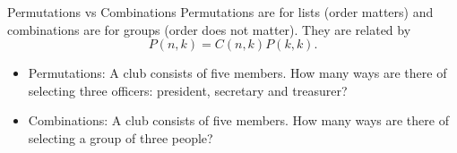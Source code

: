\documentclass{beamer}
\newcommand{\ignore}[1]{}
\begin{document}
\ignore{
\begin{frame}{Combinations Rule Example}
    \begin{itemize}
        \item Give people belong to a club. How many ways can they pick a group of 3 people?
    \end{itemize}
\end{frame}


\begin{frame}{Permutations vs Combinations}
    Permutations are for lists (order matters) and combinations are for groups (order does not matter). They are related by
    $$ P(n,k) = C(n,k)P(k,k).$$
    
                \vspace{\stretch{0.5}}
    Interpretation: 
    \begin{align*}
        (\text{no. of perms}) &= (\text{no. of combs} ) 
                                   \times (\text{ no. of perms within each comb}).
    \end{align*}
\end{frame}
}
\begin{frame}{Permutations vs Combinations}
    Permutations are for lists (order matters) and combinations are for groups (order does not matter). They are related by
    $$ P(n,k) = C(n,k)P(k,k).$$
 
    \begin{itemize}
        \item Permutations: A club consists of five members. How many ways are there of selecting three officers: president, secretary and treasurer?
        \item Combinations: A club consists of five members. How many ways are there of selecting a group of three people?
    \end{itemize}
\end{frame}
\end{document}
